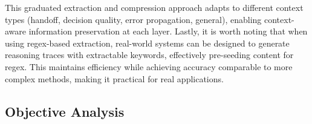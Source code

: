 \documentclass{article}
\begin{document}
This graduated extraction and compression approach adapts to different context types (handoff, decision quality, error propagation, general), enabling context-aware information preservation at each layer. Lastly, it is worth noting that when using regex-based extraction, real-world systems can be designed to generate reasoning traces with extractable keywords, effectively pre-seeding content for regex. This maintains efficiency while achieving accuracy comparable to more complex methods, making it practical for real applications.


\subsection{Objective Analysis}

\end{document}
